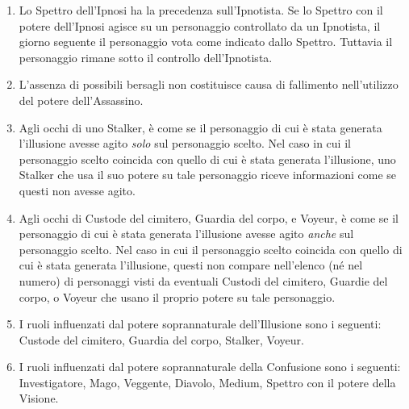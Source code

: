 \documentclass[a4paper,10pt]{article}
\begin{document}
\begin{enumerate}
 \item Lo Spettro dell'Ipnosi ha la precedenza sull'Ipnotista. Se lo Spettro con il potere dell'Ipnosi agisce su un personaggio controllato da un Ipnotista, il giorno seguente il personaggio vota come indicato dallo Spettro. Tuttavia il personaggio rimane sotto il controllo dell'Ipnotista.
 
 \item L'assenza di possibili bersagli non costituisce causa di fallimento nell'utilizzo del potere dell'Assassino.
 
 \item Agli occhi di uno Stalker, è come se il personaggio di cui è stata generata l'illusione avesse agito \emph{solo} sul personaggio scelto. Nel caso in cui il personaggio scelto coincida con quello di cui è stata generata l'illusione, uno Stalker che usa il suo potere su tale personaggio riceve informazioni come se questi non avesse agito.
 
 \item Agli occhi di Custode del cimitero, Guardia del corpo, e Voyeur, è come se il personaggio di cui è stata generata l'illusione avesse agito \emph{anche} sul personaggio scelto. Nel caso in cui il personaggio scelto coincida con quello di cui è stata generata l'illusione, questi non compare nell'elenco (né nel numero) di personaggi visti da eventuali Custodi del cimitero, Guardie del corpo, o Voyeur che usano il proprio potere su tale personaggio.
 
 \item I ruoli influenzati dal potere soprannaturale dell'Illusione sono i seguenti: Custode del cimitero, Guardia del corpo, Stalker, Voyeur.
 
 \item I ruoli influenzati dal potere soprannaturale della Confusione sono i seguenti: Investigatore, Mago, Veggente, Diavolo, Medium, Spettro con il potere della Visione.
 
% 
 

\end{enumerate}
\end{document}
